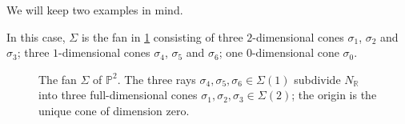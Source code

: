 We will keep two examples in mind.
\begin{example}\label{ex:P2}
    In this case, $\Sigma$ is the fan in \cref{fig:torP2} consisting of three $2$-dimensional cones $\sigma_1$, $\sigma_2$ and $\sigma_3$; three $1$-dimensional cones $\sigma_4$, $\sigma_5$ and $\sigma_6$; one $0$-dimensional cone $\sigma_0$.

    \begin{figure}[ht]
\centering
{}
\caption{The fan $\Sigma$ of $\mathbb{P}^2$. The three rays $\sigma_4,\sigma_5,\sigma_6\in\Sigma(1)$ subdivide $N_{\mathbb{R}}$ into three full-dimensional cones $\sigma_1,\sigma_2,\sigma_3\in\Sigma(2)$; the origin is the unique cone of dimension zero.}
\label{fig:torP2}
\end{figure}


\end{example}
